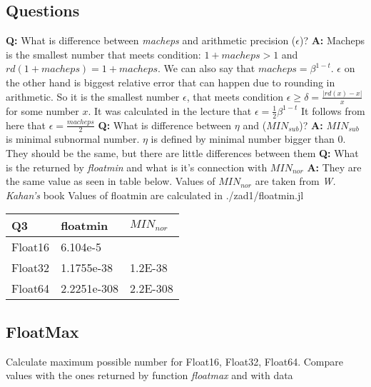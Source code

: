 \documentclass[12pt]{article}
\begin{document}
\subsection{Questions}
\textbf{Q:} What is difference between \emph{macheps} and arithmetic precision ($\epsilon$)? \newline
\textbf{A:} Macheps is the smallest number that meets condition: $1+macheps > 1$ and $rd(1+macheps) = 1+macheps$. We can also say that $macheps=\beta^{1-t}$.  
$\epsilon$ on the other hand is biggest relative error that can happen due to rounding 
in arithmetic. So it is the smallest number $\epsilon$, 
that meets condition  $ \epsilon \geq \delta = \frac{|rd(x) - x|}{x}$ for some number $x$. It was calculated in the lecture that $\epsilon = \frac{1}{2}\beta^{1-t}$ 
\newline It follows from here that $\epsilon = \frac{macheps}{2}$
\newline
\textbf{Q:} What is difference between $\eta$ and ($MIN_{sub}$)? \newline
\textbf{A:} $MIN_{sub}$ is minimal subnormal number. $\eta$ is defined by minimal number bigger than 0. 
They should be the same, but there are little differences between them \newline
\textbf{Q:} What is the returned by \emph{floatmin} and what is it's connection with $MIN_{nor}$ \newline
\textbf{A:} They are the same value as seen in table below. \newline
Values of $MIN_{nor}$ are taken from \emph{W. Kahan's} book \newline
Values of floatmin are calculated in ./zad1/floatmin.jl
\begin{table}[!ht]
    \centering
    \begin{tabular}{|l|l|l|}
    \hline
        Q3 & floatmin & $MIN_{nor}$ \\ \hline
        Float16 & 6.104e-5 & ~ \\ \hline
        Float32 & 1.1755e-38 & 1.2E-38 \\ \hline
        Float64 & 2.2251e-308 & 2.2E-308 \\ \hline
    \end{tabular}
\end{table}
\subsection{FloatMax}
Calculate maximum possible number for Float16, Float32, Float64. 
Compare values with the ones returned by function \emph{floatmax} and with data 
\end{document}
